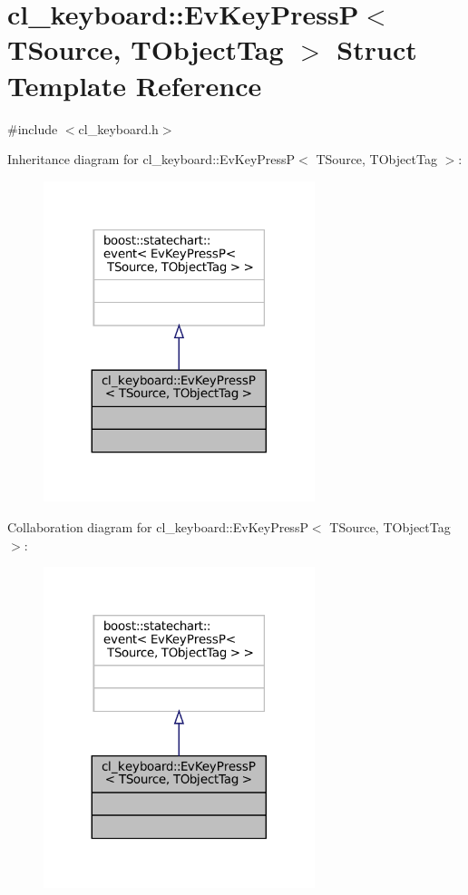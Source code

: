 \hypertarget{structcl__keyboard_1_1EvKeyPressP}{}\section{cl\+\_\+keyboard\+:\+:Ev\+Key\+PressP$<$ T\+Source, T\+Object\+Tag $>$ Struct Template Reference}
\label{structcl__keyboard_1_1EvKeyPressP}


{\ttfamily \#include $<$cl\+\_\+keyboard.\+h$>$}



Inheritance diagram for cl\+\_\+keyboard\+:\+:Ev\+Key\+PressP$<$ T\+Source, T\+Object\+Tag $>$\+:
\nopagebreak
\begin{figure}[H]
\begin{center}
\leavevmode
\includegraphics[width=224pt]{structcl__keyboard_1_1EvKeyPressP__inherit__graph}
\end{center}
\end{figure}


Collaboration diagram for cl\+\_\+keyboard\+:\+:Ev\+Key\+PressP$<$ T\+Source, T\+Object\+Tag $>$\+:
\nopagebreak
\begin{figure}[H]
\begin{center}
\leavevmode
\includegraphics[width=224pt]{structcl__keyboard_1_1EvKeyPressP__coll__graph}
\end{center}
\end{figure}


